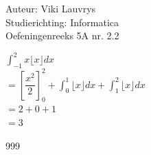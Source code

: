 \documentclass[a4paper]{article}
\begin{document}
  
\noindent \large Auteur: Viki	Lauvrys \\
\noindent \large Studierichting: Informatica\\
\noindent \large Oefeningenreeks 5A nr. 2.2\\

\medskip

\normalsize

$ \displaystyle\int^2_{-1} x \lfloor x \rfloor dx $ \\

$ = \left[ \dfrac{x^2}{2} \right]^2_0 + \displaystyle\int^1_0 \lfloor x \rfloor dx + \displaystyle\int^2_1 \lfloor x \rfloor dx $ \\

$ = 2 + 0 + 1 $ \\

$ = 3 $ \\


\begin{thebibliography}{999}
\end{thebibliography}
\end{document}
